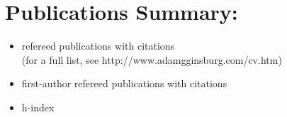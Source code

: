 \begin{minipage}{\textwidth}
\setlength{\extrarowheight}{0pt}
\section*{Publications Summary: }
\vspace{-12pt}
\begin{itemize}
\itemsep-3pt
\item \nrefereed refereed publications with \ncites citations\\
{\normalsize(for a full list, see http://www.adamgginsburg.com/cv.htm)}
\item \nfirst first-author refereed publications with \ncitesfirst citations
\item h-index \hindex

\end{itemize}


\end{minipage}
\vspace{4mm}

